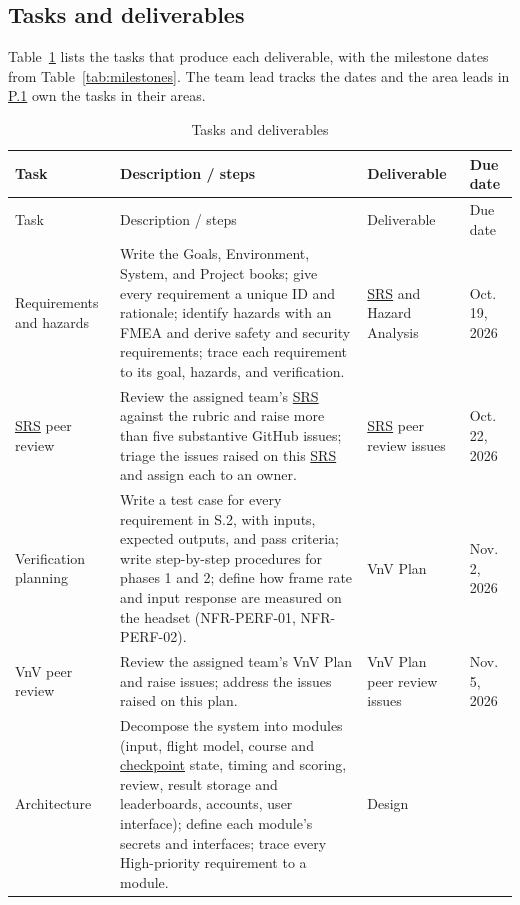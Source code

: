 \documentclass[12pt]{article}
\begin{document}
\subsection{Tasks and deliverables}\label{p4}


Table~\ref{tab:deliverables} lists the tasks that produce each deliverable,
with the milestone dates from Table~\ref{tab:milestones}. The team lead tracks
the dates and the area leads in \hyperref[p1]{P.1} own the tasks in their
areas.

\begin{longtable}{@{}p{}p{}p{}p{}@{}}
\caption{Tasks and deliverables}\label{tab:deliverables}\\
\toprule Task & Description / steps & Deliverable & Due date
\\\midrule\endfirsthead
\toprule Task & Description / steps & Deliverable & Due date
\\\midrule\endhead
\bottomrule\endfoot
Requirements and hazards & Write the Goals, Environment, System, and Project
books; give every requirement a unique ID and rationale; identify hazards with
an FMEA and derive safety and security requirements; trace each requirement
to its goal, hazards, and verification. & \hyperlink{glos:SRS}{SRS} and Hazard Analysis &
Oct. 19, 2026 \\
\hyperlink{glos:SRS}{SRS} peer review & Review the assigned team's \hyperlink{glos:SRS}{SRS} against the rubric and raise
more than five substantive GitHub issues; triage the issues raised on this
\hyperlink{glos:SRS}{SRS} and assign each to an owner. & \hyperlink{glos:SRS}{SRS} peer review issues & Oct. 22, 2026 \\
Verification planning & Write a test case for every requirement in
S.2, with inputs, expected outputs, and pass criteria; write
step-by-step procedures for phases 1 and 2; define how frame rate and input
response are measured on the headset (NFR-PERF-01, NFR-PERF-02). & VnV Plan &
Nov. 2, 2026 \\
VnV peer review & Review the assigned team's VnV Plan and raise issues;
address the issues raised on this plan. & VnV Plan peer review issues &
Nov. 5, 2026 \\
Architecture & Decompose the system into modules (input, flight model, course
and \hyperlink{glos:Checkpoint}{checkpoint} state, timing and scoring, review, result storage and
leaderboards, accounts, user interface); define each module's secrets and
interfaces; trace every High-priority requirement to a module. & Design

\end{longtable}
\end{document}
